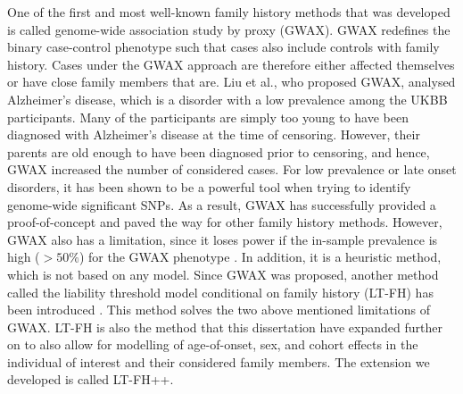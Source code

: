 One of the first and most well-known family history methods that was developed is called genome-wide association study by proxy (GWAX)\cite{gwax}. GWAX redefines the binary case-control phenotype such that cases also include controls with family history. Cases under the GWAX approach are therefore either affected themselves or have close family members that are. Liu et al., who proposed GWAX, analysed Alzheimer's disease, which is a disorder with a low prevalence among the UKBB participants. Many of the participants are simply too young to have been diagnosed with Alzheimer's disease at the time of censoring. However, their parents are old enough to have been diagnosed prior to censoring, and hence, GWAX increased the number of considered cases. For low prevalence or late onset disorders, it has been shown to be a powerful tool when trying to identify genome-wide significant SNPs\cite{hujoel2020liability,gwax,pedersen2022accounting}. As a result, GWAX has successfully provided a proof-of-concept and paved the way for other family history methods. However, GWAX also has a limitation, since it loses power if the in-sample prevalence is high ($ >50\% $) for the GWAX phenotype \cite{gwax}. In addition, it is a heuristic method, which is not based on any model. Since GWAX was proposed, another method called the liability threshold model conditional on family history (LT-FH) has been introduced \cite{hujoel2020liability}. This method solves the two above mentioned limitations of GWAX. LT-FH is also the method that this dissertation have expanded further on to also allow for modelling of age-of-onset, sex, and cohort effects in the individual of interest and their considered family members. The extension we developed is called LT-FH++\cite{pedersen2022accounting}.

